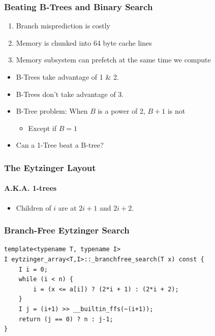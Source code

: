 \documentclass[xcolor=dvipsnames]{beamer}
\begin{document}
\begin{frame}
   \frametitle{Beating B-Trees and Binary Search}

   \begin{enumerate}[<+->]
      \item Branch misprediction is costly
      \item Memory is chunked into 64 byte cache lines
      \item Memory subsystem can prefetch at the same time we compute
   \end{enumerate}
   \begin{itemize}[<+->]
      \item B-Trees take advantage of 1 \& 2.
      \item B-Trees don't take advantage of 3.
      \item B-Tree problem: When $B$ is a power of 2, $B+1$ is not
      \begin{itemize}[<+->]
        \item Except if $B=1$
      \end{itemize}
      \item Can a 1-Tree beat a B-tree?
   \end{itemize}
\end{frame}

\begin{frame}
   \frametitle{The Eytzinger Layout}
   \framesubtitle{A.K.A. 1-trees}
  
   \begin{center}
   \end{center} 
   \begin{itemize}
     \item Children of $i$ are at $2i+1$ and $2i+2$.
   \end{itemize}
\end{frame}

\begin{frame}[fragile]
   \frametitle{Branch-Free Eytzinger Search}

{\small 
\begin{verbatim}
template<typename T, typename I>
I eytzinger_array<T,I>::_branchfree_search(T x) const {
    I i = 0;
    while (i < n) {
        i = (x <= a[i]) ? (2*i + 1) : (2*i + 2);
    }
    I j = (i+1) >> __builtin_ffs(~(i+1));
    return (j == 0) ? n : j-1;
}
\end{verbatim} 
}
\end{frame}
\end{document}
